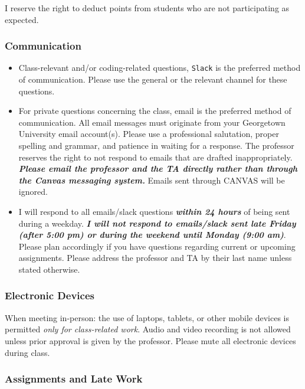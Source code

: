 \documentclass[
  12pt,
]{article}
\begin{document}
I reserve the right to deduct points from students who are not
participating as expected.

\hypertarget{communication}{%
\subsubsection{Communication}\label{communication}}

\begin{itemize}
\item
  Class-relevant and/or coding-related questions, \texttt{Slack} is the
  preferred method of communication. Please use the general or the
  relevant channel for these questions.
\item
  For private questions concerning the class, email is the preferred
  method of communication. All email messages must originate from your
  Georgetown University email account(s). Please use a professional
  salutation, proper spelling and grammar, and patience in waiting for a
  response. The professor reserves the right to not respond to emails
  that are drafted inappropriately. \textbf{\emph{Please email the
  professor and the TA directly rather than through the Canvas messaging
  system.}} Emails sent through CANVAS will be ignored.
\item
  I will respond to all emails/slack questions \textbf{\emph{within 24
  hours}} of being sent during a weekday. \textbf{\emph{I will not
  respond to emails/slack sent late Friday (after 5:00 pm) or during the
  weekend until Monday (9:00 am)}}. Please plan accordingly if you have
  questions regarding current or upcoming assignments. Please address
  the professor and TA by their last name unless stated otherwise.
\end{itemize}

\hypertarget{electronic-devices}{%
\subsubsection{Electronic Devices}\label{electronic-devices}}

When meeting in-person: the use of laptops, tablets, or other mobile
devices is permitted \emph{only for class-related work}. Audio and video
recording is not allowed unless prior approval is given by the
professor. Please mute all electronic devices during class.

\hypertarget{assignments-and-late-work}{%
\subsubsection{Assignments and Late
Work}\label{assignments-and-late-work}}
\end{document}
